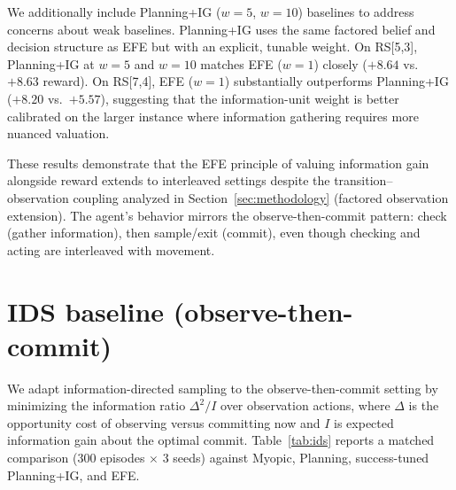 \documentclass[runningheads]{llncs}
\begin{document}
We additionally include Planning+IG ($w{=}5$, $w{=}10$) baselines to address concerns about weak baselines. Planning+IG uses the same factored belief and decision structure as EFE but with an explicit, tunable weight. On RS[5,3], Planning+IG at $w{=}5$ and $w{=}10$ matches EFE ($w{=}1$) closely ($+8.64$ vs.\ $+8.63$ reward). On RS[7,4], EFE ($w{=}1$) substantially outperforms Planning+IG ($+8.20$ vs.\ $+5.57$), suggesting that the information-unit weight is better calibrated on the larger instance where information gathering requires more nuanced valuation.

These results demonstrate that the EFE principle of valuing information gain alongside reward extends to interleaved settings despite the transition--observation coupling analyzed in Section~\ref{sec:methodology} (factored observation extension). The agent's behavior mirrors the observe-then-commit pattern: check (gather information), then sample/exit (commit), even though checking and acting are interleaved with movement.

\section{IDS baseline (observe-then-commit)}
\label{app:ids}

We adapt information-directed sampling \citep{russo2014} to the observe-then-commit setting by minimizing the information ratio $\Delta^2/I$ over observation actions, where $\Delta$ is the opportunity cost of observing versus committing now and $I$ is expected information gain about the optimal commit. Table~\ref{tab:ids} reports a matched comparison (300 episodes $\times$ 3 seeds) against Myopic, Planning, success-tuned Planning+IG, and EFE.
\end{document}
